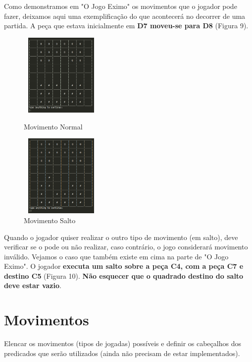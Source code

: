 \documentclass[a4paper]{article}
\begin{document}
\begin{small}
Como demonstramos em "O Jogo Eximo" os movimentos que o jogador pode fazer, deixamos aqui uma exemplificação do que acontecerá no decorrer de uma partida. A peça que estava inicialmente em \textbf{D7 moveu-se para D8} (Figura 9).
\begin{figure}[h!]
  \begin{minipage}[h!]{0.3\textwidth}
    \includegraphics[height=4cm,width=4cm]{res/normalMoveConsole.png}
    \caption{Movimento Normal}
    \label{fig:9}
  \end{minipage}
	\quad\quad\quad\quad	\quad\quad\quad\quad	
  \begin{minipage}[h!]{0.3\textwidth}
    \includegraphics[height=4cm,width=4cm]{res/jumpMoveConsole.png}
    \caption{Movimento Salto}
    \label{fig:10}
  \end{minipage}
\end{figure}\newline
\end{small}

\begin{small}
Quando o jogador quiser realizar o outro tipo de movimento (em salto), deve verificar se o pode ou não realizar, caso contrário, o jogo considerará movimento inválido. Vejamos o caso que também existe em cima na parte de "O Jogo Eximo". O jogador \textbf{executa um salto sobre a peça C4, com a peça C7 e destino C5} (Figura 10). \textbf{Não esquecer que o quadrado destino do salto deve estar vazio}.
\end{small}

\section{Movimentos}

Elencar os movimentos (tipos de jogadas) possíveis e definir os cabeçalhos dos predicados que serão utilizados (ainda não precisam de estar implementados).
\end{document}
